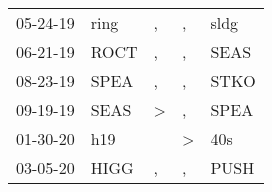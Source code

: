 \begin{supertabular}{p{0.07\textwidth}p{0.06\textwidth}p{0.02\textwidth}p{0.02\textwidth}p{0.06\textwidth}}
          05-24-19\textsuperscript{} &           ring\textsuperscript{} &                , &                , &           sldg\textsuperscript{} \\
          06-21-19\textsuperscript{} &           ROCT\textsuperscript{} &                , &                , &           SEAS\textsuperscript{} \\
          08-23-19\textsuperscript{} &           SPEA\textsuperscript{} &                , &                , &           STKO\textsuperscript{} \\
          09-19-19\textsuperscript{} &           SEAS\textsuperscript{} &     \textgreater &                , &           SPEA\textsuperscript{} \\
          01-30-20\textsuperscript{} &            h19\textsuperscript{} &                  &     \textgreater &            40s\textsuperscript{} \\
          03-05-20\textsuperscript{} &           HIGG\textsuperscript{} &                , &                , &           PUSH\textsuperscript{} \\
\end{supertabular}
